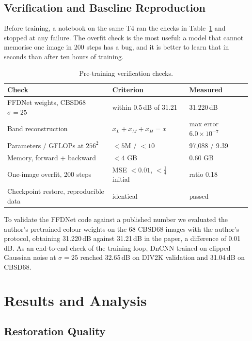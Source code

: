 \documentclass[12pt,a4paper,oneside]{NITR}
\newcommand{\dB}{\,dB}
\begin{document}
\section{Verification and Baseline Reproduction}\label{sec:verification}

Before training, a notebook on the same T4 ran the checks in
Table~\ref{tab:gates} and stopped at any failure. The overfit check is the
most useful: a model that cannot memorise one image in 200 steps has a bug,
and it is better to learn that in seconds than after ten hours of training.

\begin{table}[htbp]
	\centering
	\caption{Pre-training verification checks.}
	\label{tab:gates}
	\small
	\begin{tabular}{@{}lll@{}}
		\toprule
		Check & Criterion & Measured \\
		\midrule
		FFDNet weights, CBSD68 $\sigma{=}25$ & within 0.5\dB{} of 31.21 & 31.220\dB \\
		Band reconstruction & $x_L{+}x_M{+}x_H = x$ & max error $6.0\times10^{-7}$ \\
		Parameters / GFLOPs at $256^2$ & $<5$M / $<10$ & 97,088 / 9.39 \\
		Memory, forward + backward & $< 4$ GB & 0.60 GB \\
		One-image overfit, 200 steps & MSE $<0.01$, $<\frac14$ initial & ratio 0.18 \\
		Checkpoint restore, reproducible data & identical & passed \\
		\bottomrule
	\end{tabular}
\end{table}

To validate the FFDNet code against a published number we evaluated the
author's pretrained colour weights \cite{kair} on the 68 CBSD68 images
\cite{martin2001bsd} with the author's protocol, obtaining 31.220\dB{}
against 31.21\dB{} in the paper, a difference of 0.01\dB{}. As an end-to-end
check of the training loop, DnCNN trained on clipped Gaussian noise at
$\sigma=25$ reached 32.65\dB{} on DIV2K validation and 31.04\dB{} on CBSD68.


\chapter{Results and Analysis}\label{ch:results}

\section{Restoration Quality}\label{sec:main-table}
\end{document}
